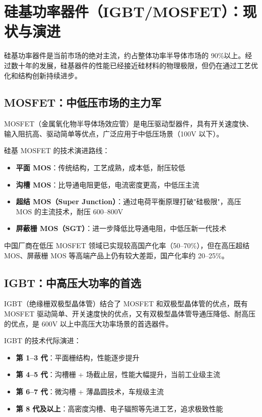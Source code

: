 
\section{硅基功率器件（IGBT/MOSFET）：现状与演进}

硅基功率器件是当前市场的绝对主流，约占整体功率半导体市场的 90\%以上。经过数十年的发展，硅基器件的性能已经接近硅材料的物理极限，但仍在通过工艺优化和结构创新持续进步。

\subsection{MOSFET：中低压市场的主力军}

MOSFET（金属氧化物半导体场效应管）是电压驱动型器件，具有开关速度快、输入阻抗高、驱动简单等优点，广泛应用于中低压场景（100V 以下）。

硅基 MOSFET 的技术演进路线：
\begin{itemize}[leftmargin=2em]
\item \textbf{平面 MOS}：传统结构，工艺成熟，成本低，耐压较低
\item \textbf{沟槽 MOS}：比导通电阻更低，电流密度更高，中低压主流
\item \textbf{超结 MOS（Super Junction）}：通过电荷平衡原理打破"硅极限"，高压 MOS 的主流技术，耐压 600–800V
\item \textbf{屏蔽栅 MOS（SGT）}：进一步降低比导通电阻，中低压新一代技术
\end{itemize}

中国厂商在低压 MOSFET 领域已实现较高国产化率（50–70\%），但在高压超结 MOS、屏蔽栅 MOS 等高端产品上仍有较大差距，国产化率约 20–25\%。

\subsection{IGBT：中高压大功率的首选}

IGBT（绝缘栅双极型晶体管）结合了 MOSFET 和双极型晶体管的优点，既有 MOSFET 驱动简单、开关速度快的优点，又有双极型晶体管导通压降低、耐高压的优点，是 600V 以上中高压大功率场景的首选器件。

IGBT 的技术代际演进：
\begin{itemize}[leftmargin=2em]
\item \textbf{第 1–3 代}：平面栅结构，性能逐步提升
\item \textbf{第 4–5 代}：沟槽栅 + 场截止层，性能大幅提升，当前工业级主流
\item \textbf{第 6–7 代}：微沟槽 + 薄晶圆技术，车规级主流
\item \textbf{第 8 代及以上}：高密度沟槽、电子辐照等先进工艺，追求极致性能
\end{itemize}


